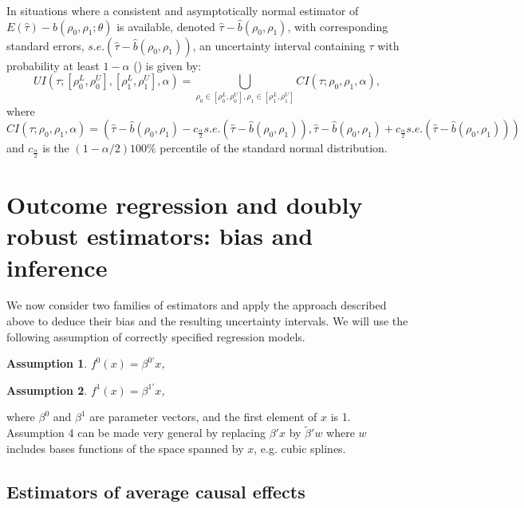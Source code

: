 \documentclass[11pt]{article}
\makeatletter
\newenvironment{subtheorem}[1]{%
  \def\subtheoremcounter{#1}%
  \refstepcounter{#1}%
  \protected@edef\theparentnumber{\csname the#1\endcsname}%
  \setcounter{parentnumber}{\value{#1}}%
  \setcounter{#1}{0}%
  \expandafter\def\csname the#1\endcsname{\theparentnumber\:\alph{#1}}%
  \ignorespaces
}{%
  \setcounter{\subtheoremcounter}{\value{parentnumber}}%
  \ignorespacesafterend
}
\newcounter{parentnumber}
\newtheorem{Ass}{Assumption}
\makeatother
\begin{document}
In situations where a consistent and asymptotically normal estimator of $E(\hat\tau)-b(\rho_0,\rho_1;\theta)$ is available, denoted $\hat\tau-\hat b(\rho_0,\rho_1)$, with corresponding standard errors, $s.e.(\hat\tau-\hat b(\rho_0,\rho_1))$, an uncertainty interval containing $\tau$ with probability at least $1-\alpha$ (\citealp{Tanja}) is given by:
\begin{equation}
UI(\tau; [\rho_0^L,\rho_0^U], [\rho_1^L,\rho_1^U],\alpha)=\bigcup_{\rho_0 \in [\rho_0^L,\rho_0^U],\rho_1\in [\rho_1^L,\rho_1^U]} CI(\tau; \rho_0,\rho_1,\alpha),
\label{UI.eqn}
\end{equation}
where
\begin{equation*}
CI(\tau; \rho_0,\rho_1,\alpha)=\left(  \hat\tau-\hat b(\rho_0,\rho_1) - c_{\frac{\alpha}{2}}s.e.(\hat\tau-\hat b(\rho_0,\rho_1)), \hat\tau-\hat b(\rho_0,\rho_1) + c_{\frac{\alpha}{2}}s.e.(\hat\tau-\hat b(\rho_0,\rho_1)) \right)
\label{CI.eqn}
\end{equation*}
and $c_{\frac{\alpha}{2}}$ is the $(1-\alpha/2)100 \%$ percentile of the standard normal distribution.



\section[Identification intervals associated to outcome regression and doubly robust estimators]{Outcome regression and doubly robust estimators: bias and inference} 
\label{Bias.sec}
 We now consider two families of estimators and apply the approach described above to deduce their bias and the resulting uncertainty intervals. We will use the following assumption of correctly specified regression models.

\begin{subtheorem}{Ass}
\label{Ass4}
\begin{Ass}
$f^0(x)=\beta^{0'}x$,
\label{Ass4a}
\end{Ass}
\begin{Ass}
$f^1(x)=\beta^{1'}x$,
\label{Ass4b}
\end{Ass}
\end{subtheorem}
where $\beta^0$ and $\beta^1$ are parameter vectors, and the first element of $x$ is 1. Assumption 4 can be made very general by replacing $\beta' x$ by $\tilde \beta' w$ where $w$ includes bases functions of the space spanned by $x$, e.g. cubic splines. 

\subsection{Estimators of average causal effects}
\label{Estimators}
\end{document}

